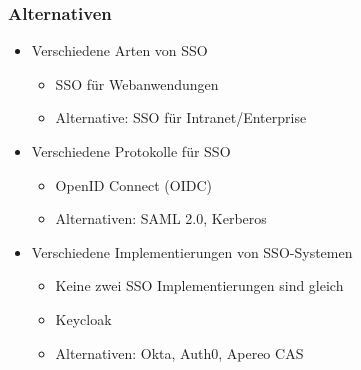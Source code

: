 \documentclass{beamer}
\begin{document}
\begin{frame}
\frametitle{Alternativen}
\begin{itemize}
\item Verschiedene Arten von SSO
	\begin{itemize}
	\item SSO für Webanwendungen
	\item Alternative: SSO für Intranet/Enterprise
	\end{itemize}
\item Verschiedene Protokolle für SSO
	\begin{itemize}
	\item OpenID Connect (OIDC)
	\item Alternativen: SAML 2.0, Kerberos
	\end{itemize}
\item Verschiedene Implementierungen von SSO-Systemen
	\begin{itemize}
	\item Keine zwei SSO Implementierungen sind gleich
	\item Keycloak
	\item Alternativen: Okta, Auth0, Apereo CAS
	\end{itemize}
\end{itemize}
\end{frame}
\end{document}
